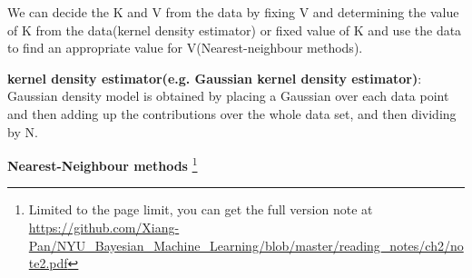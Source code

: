 \documentclass{article}
\begin{document}
We can decide the K and V from the data by fixing V and determining the value of K from the data(kernel density estimator) or ﬁxed value of K and use the data to ﬁnd an appropriate value for V(Nearest-neighbour methods).

\textbf{kernel density estimator(e.g. Gaussian kernel density estimator)}: Gaussian density model is obtained by placing a Gaussian over each data point and then adding up the contributions over the whole data set, and then dividing by N.

\textbf{Nearest-Neighbour methods}
\footnote{Limited to the page limit, you can get the full version note at \url{https://github.com/Xiang-Pan/NYU_Bayesian_Machine_Learning/blob/master/reading_notes/ch2/note2.pdf} }









\end{document}
